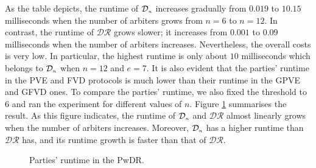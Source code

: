 As the  table depicts, the runtime of $\mathcal{D}_{\scriptscriptstyle n}$    increases gradually from $0.019$ to $10.15$ milliseconds when the number of arbiters grows from $n=6$ to $n=12$.  In contrast, the runtime of $\mathcal{DR}$ grows slower; it increases from  $0.001$ to $0.09$ milliseconds when the number of arbiters increases. Nevertheless, the overall costs is very low. In particular, the highest runtime is only about $10$ milliseconds which belongs to $\mathcal{D}_{\scriptscriptstyle n}$ when $n=12$ and $e=7$. It is also evident that the parties' runtime in the PVE and FVD protocols is much lower than their runtime in the GPVE and GFVD ones. To compare the  parties' runtime, we also fixed the threshold to $6$ and ran the experiment for different values of $n$. Figure  \ref{plot::runtime} summarises the result. As this figure indicates, the  runtime of  $\mathcal{D}_{\scriptscriptstyle n}$ and $\mathcal{DR}$ almost linearly grows when the number of arbiters increases. Moreover,   $\mathcal{D}_{\scriptscriptstyle n}$  has a higher  runtime than $\mathcal{DR}$ has,   and its runtime growth is faster than that of $\mathcal{DR}$. 
%
\begin{figure}[H]
\centering
{}
\caption{\small Parties' runtime in the PwDR.}\label{plot::runtime}
\end{figure}










